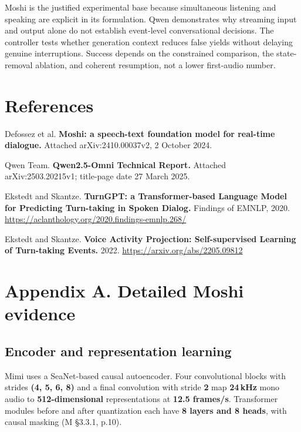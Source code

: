 \documentclass[11pt]{article}
\begin{document}
Moshi is the justified experimental base because simultaneous listening and speaking are explicit in its formulation. Qwen demonstrates why streaming input and output alone do not establish event-level conversational decisions. The controller tests whether generation context reduces false yields without delaying genuine interruptions. Success depends on the constrained comparison, the state-removal ablation, and coherent resumption, not a lower first-audio number.

\section*{References}
\begin{enumerate}[label={[\arabic*]}, leftmargin=1.6em, itemsep=0.3em]
\item Defossez et al. \textbf{Moshi: a speech-text foundation model for real-time dialogue.} Attached arXiv:2410.00037v2, 2 October 2024.
\item Qwen Team. \textbf{Qwen2.5-Omni Technical Report.} Attached arXiv:2503.20215v1; title-page date 27 March 2025.
\item Ekstedt and Skantze. \textbf{TurnGPT: a Transformer-based Language Model for Predicting Turn-taking in Spoken Dialog.} Findings of EMNLP, 2020. \url{https://aclanthology.org/2020.findings-emnlp.268/}
\item Ekstedt and Skantze. \textbf{Voice Activity Projection: Self-supervised Learning of Turn-taking Events.} 2022. \url{https://arxiv.org/abs/2205.09812}
\end{enumerate}

\newpage
\section*{Appendix A. Detailed Moshi evidence}

\subsection*{Encoder and representation learning}

Mimi uses a SeaNet-based causal autoencoder. Four convolutional blocks with strides \textbf{(4, 5, 6, 8)} and a final convolution with stride \textbf{2} map \textbf{24\,kHz} mono audio to \textbf{512-dimensional} representations at \textbf{12.5 frames/s}. Transformer modules before and after quantization each have \textbf{8 layers and 8 heads}, with causal masking (M §3.3.1, p.10).
\end{document}

